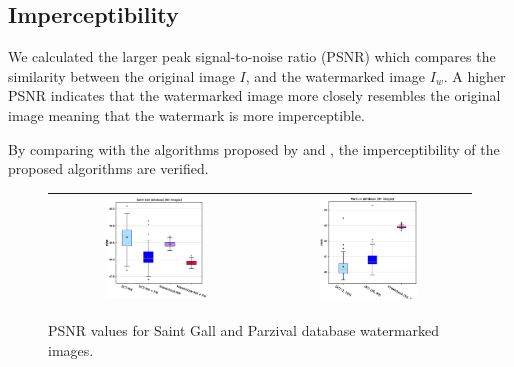 \documentclass[runningheads]{llncs}
\begin{document}
\subsection{Imperceptibility}
We calculated the larger peak signal-to-noise ratio (PSNR) which compares the similarity between the original image $ I $, and the watermarked image $ I_w $. A higher PSNR indicates that the watermarked image more closely resembles the original image meaning that the watermark is more imperceptible.

By comparing with the algorithms proposed by \cite{liu2018blind} and \cite{shivani2017dual}, the imperceptibility of the proposed algorithms are verified.
\begin{figure}[H]
	\begin{center}
		\begin{tabular}{|c|c|}\hline
			\includegraphics[width=0.5\textwidth]{PSNR_saintgall.eps}
			&\includegraphics[width=0.5\textwidth]{PSNR_parzival.eps}\\\hline
		\end{tabular}
	\end{center}
	\caption{PSNR values for Saint Gall and Parzival database watermarked images.}
	\label{psnr}
\end{figure}
\end{document}
